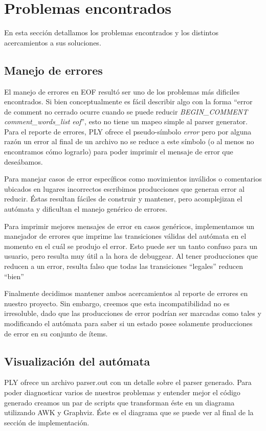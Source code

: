 \section{Problemas encontrados}
En esta sección detallamos los problemas encontrados y los distintos acercamientos a sus soluciones.

\subsection{Manejo de errores}
El manejo de errores en EOF resultó ser uno de los problemas más dificiles encontrados.
Si bien conceptualmente es fácil describir algo con la forma ``error de comment no cerrado ocurre cuando se puede
reducir \textit{BEGIN\_COMMENT comment\_words\_list eof}'', esto no tiene un mapeo
simple al parser generator. Para el reporte de errores, PLY ofrece el
pseudo-símbolo \textit{error} pero por alguna razón un error al final de un archivo no
se reduce a este símbolo (o al menos no encontramos cómo lograrlo) para poder
imprimir el mensaje de error que deseábamos.

Para manejar casos de error específicos como movimientos inválidos o
comentarios ubicados en lugares incorrectos escribimos producciones que generan
error al reducir. Éstas resultan fáciles de construir y mantener, pero
acomplejizan el autómata y dificultan el manejo genérico de errores.

Para imprimir mejores mensajes de error en casos genéricos, implementamos
un manejador de errores que imprime las transiciones válidas del
autómata en el momento en el cuál se produjo el error. Esto puede ser un tanto
confuso para un usuario, pero resulta muy útil a la hora de debuggear. Al tener
producciones que reducen a un error, resulta falso que todas las transiciones ``legales'' reducen ``bien''

Finalmente decidimos mantener ambos acercamientos al reporte de errores en
nuestro proyecto. Sin embargo, creemos que esta incompatibilidad no es
irresoluble, dado que las producciones de error podrían ser marcadas como tales
y modificando el autómata para saber si un estado posee solamente
producciones de error en su conjunto de ítems.

\subsection{Visualización del autómata}
PLY ofrece un archivo parser.out con un detalle sobre el parser generado. Para poder diagnosticar varios de nuestros problemas y entender mejor el código generado creamos un par de scripts que transforman éste en un diagrama utilizando AWK y Graphviz. Éste es el diagrama que se puede ver al final de la sección de implementación.

